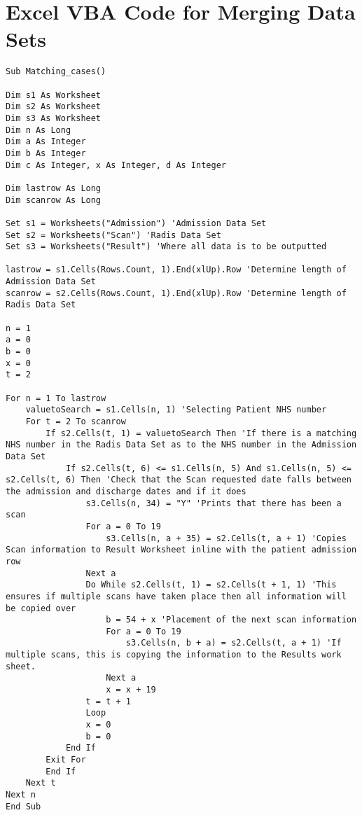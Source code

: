 \documentclass[thesis.tex]{subfiles}
\begin{document}
\chapter{Excel VBA Code for Merging Data Sets}\label{App:ExcelVBA}


\begin{Verbatim}[breaklines=true]
Sub Matching_cases()

Dim s1 As Worksheet
Dim s2 As Worksheet
Dim s3 As Worksheet
Dim n As Long
Dim a As Integer
Dim b As Integer
Dim c As Integer, x As Integer, d As Integer

Dim lastrow As Long
Dim scanrow As Long

Set s1 = Worksheets("Admission") 'Admission Data Set
Set s2 = Worksheets("Scan") 'Radis Data Set
Set s3 = Worksheets("Result") 'Where all data is to be outputted

lastrow = s1.Cells(Rows.Count, 1).End(xlUp).Row 'Determine length of Admission Data Set
scanrow = s2.Cells(Rows.Count, 1).End(xlUp).Row 'Determine length of Radis Data Set

n = 1
a = 0
b = 0
x = 0
t = 2

For n = 1 To lastrow
    valuetoSearch = s1.Cells(n, 1) 'Selecting Patient NHS number
    For t = 2 To scanrow 
        If s2.Cells(t, 1) = valuetoSearch Then 'If there is a matching NHS number in the Radis Data Set as to the NHS number in the Admission Data Set 
            If s2.Cells(t, 6) <= s1.Cells(n, 5) And s1.Cells(n, 5) <= s2.Cells(t, 6) Then 'Check that the Scan requested date falls between the admission and discharge dates and if it does
                s3.Cells(n, 34) = "Y" 'Prints that there has been a scan
                For a = 0 To 19 
                    s3.Cells(n, a + 35) = s2.Cells(t, a + 1) 'Copies Scan information to Result Worksheet inline with the patient admission row 
                Next a
                Do While s2.Cells(t, 1) = s2.Cells(t + 1, 1) 'This ensures if multiple scans have taken place then all information will be copied over
                    b = 54 + x 'Placement of the next scan information
                    For a = 0 To 19
                        s3.Cells(n, b + a) = s2.Cells(t, a + 1) 'If multiple scans, this is copying the information to the Results work sheet.
                    Next a
                    x = x + 19
                t = t + 1
                Loop
                x = 0
                b = 0
            End If
        Exit For
        End If
    Next t
Next n
End Sub
\end{Verbatim}
\end{document}
